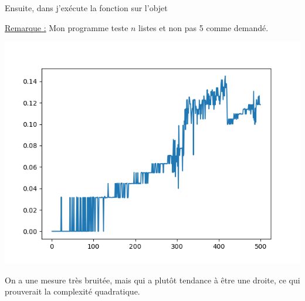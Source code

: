 \begin{enumerate}[(a)]
        \bigskip

        Ensuite, dans  j'exécute la fonction  sur l'objet

        \ul{Remarque :} Mon programme teste $n$ listes et non pas 5 comme demandé.
        \newpage
        \begin{center}
          \includegraphics[scale=0.5]{section-04/qa-3.png}
        \end{center}


        On a une mesure très bruitée, mais qui a plutôt tendance à être une
        droite, ce qui prouverait la complexité quadratique.

\end{enumerate}
